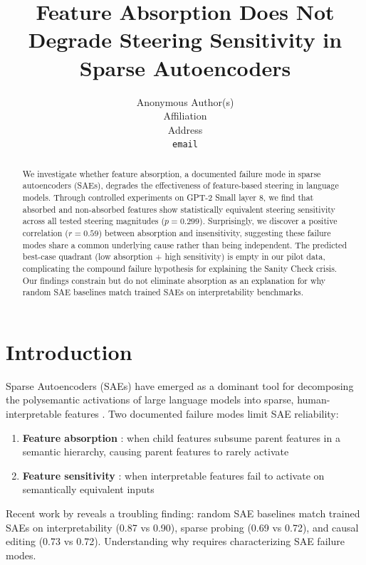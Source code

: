 \documentclass{article}
\title{Feature Absorption Does Not Degrade Steering Sensitivity in Sparse Autoencoders}
\author{
  Anonymous Author(s) \\
  Affiliation \\
  Address \\
  \texttt{email}
}
\begin{document}
\maketitle

\begin{abstract}
We investigate whether feature absorption, a documented failure mode in sparse autoencoders (SAEs), degrades the effectiveness of feature-based steering in language models. Through controlled experiments on GPT-2 Small layer 8, we find that absorbed and non-absorbed features show statistically equivalent steering sensitivity across all tested steering magnitudes ($p = 0.299$). Surprisingly, we discover a positive correlation ($r = 0.59$) between absorption and insensitivity, suggesting these failure modes share a common underlying cause rather than being independent. The predicted best-case quadrant (low absorption + high sensitivity) is empty in our pilot data, complicating the compound failure hypothesis for explaining the Sanity Check crisis. Our findings constrain but do not eliminate absorption as an explanation for why random SAE baselines match trained SAEs on interpretability benchmarks.
\end{abstract}

\section{Introduction}

Sparse Autoencoders (SAEs) have emerged as a dominant tool for decomposing the polysemantic activations of large language models into sparse, human-interpretable features \citep{cunningham2023sparse, bricken2023training}. Two documented failure modes limit SAE reliability:

\begin{enumerate}
  \item \textbf{Feature absorption} \citep{chanin2024feature}: when child features subsume parent features in a semantic hierarchy, causing parent features to rarely activate
  \item \textbf{Feature sensitivity} \citep{tian2025feature}: when interpretable features fail to activate on semantically equivalent inputs
\end{enumerate}

Recent work by \citet{korznikov2026sanity} reveals a troubling finding: random SAE baselines match trained SAEs on interpretability (0.87 vs 0.90), sparse probing (0.69 vs 0.72), and causal editing (0.73 vs 0.72). Understanding why requires characterizing SAE failure modes.
\end{document}
